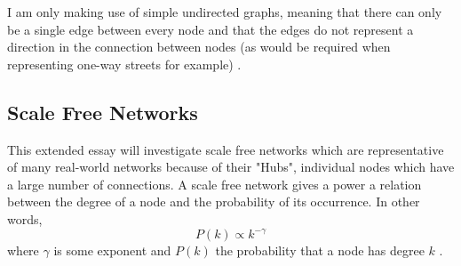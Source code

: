 \documentclass[12pt, a4paper]{article}   %
\begin{document}
I am only making use of simple undirected graphs, meaning that there can only be a single edge between every node and that the edges do not represent a direction in the connection between nodes (as would be required when representing one-way streets for example) \autocite{GraphDiscreteMathematics2026}.
\subsection{Scale Free Networks} \label{sec:scale-free-networks}

This extended essay will investigate scale free networks which are representative of many real-world networks because of their "Hubs", individual nodes which have a large number of connections. A scale free network gives a power a relation between the degree of a node and the probability of its occurrence. In other words, 
\begin{equation} \label{eq:proportional-scale-free}
    P(k) \propto k^{-\gamma}
\end{equation}
where \( \gamma \) is some exponent and \( P(k) \) the probability that a node has degree \( k \) \autocite{ScalefreeNetwork2026}.
\end{document}
